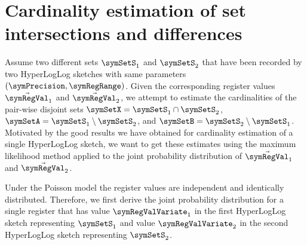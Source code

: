 \documentclass[a4paper]{scrartcl}
\begin{document}
\section{Cardinality estimation of set intersections and differences}
Assume two different sets $\symSetS_1$ and $\symSetS_2$ that have been recorded by two HyperLogLog sketches with same parameters $(\symPrecision,\symRegRange)$. Given the corresponding register values $\vec{\symRegVal}_1$ and
$\vec{\symRegVal}_2$, we attempt to estimate the cardinalities of the pair-wise disjoint sets $\symSetX = \symSetS_1\cap\symSetS_2$, $\symSetA = \symSetS_1\setminus\symSetS_2$, and $\symSetB = \symSetS_2\setminus\symSetS_1$. Motivated by the good results we have obtained for cardinality estimation of a single HyperLogLog sketch, we want to get these estimates using the maximum likelihood method applied to the joint probability distribution of $\vec{\symRegVal}_1$ and $\vec{\symRegVal}_2$.

Under the Poisson model the register values are independent and identically distributed. Therefore, we first derive the joint probability distribution for a single register that has value $\symRegValVariate_1$ in the first HyperLogLog sketch representing $\symSetS_1$ and value $\symRegValVariate_2$ in the second HyperLogLog sketch representing $\symSetS_2$. 
\end{document}
